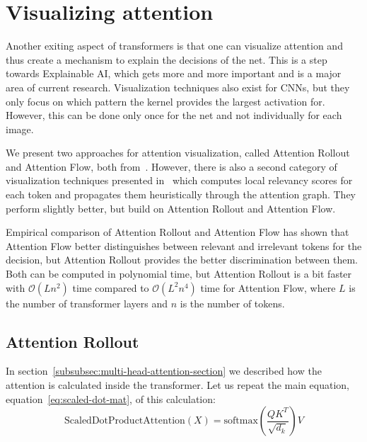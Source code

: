 \documentclass[a4paper]{scrartcl}
\let\stdsection\section
\renewcommand\section{\newpage\stdsection}
\begin{document}


    \section{Visualizing attention}\label{sec:visualizing-attention}
    Another exiting aspect of transformers is that one can visualize attention and thus create a mechanism to explain the decisions of the net.
    This is a step towards Explainable AI, which gets more and more important and is a major area of current research.
    Visualization techniques also exist for CNNs, but they only focus on which pattern the kernel provides the largest activation for.
    However, this can be done only once for the net and not individually for each image.

    We present two approaches for attention visualization, called Attention Rollout and Attention Flow, both from~\cite{abnar2020quantifying}.
    However, there is also a second category of visualization techniques presented in~\cite{chefer2021transformer} which computes local relevancy scores for each token and propagates them heuristically through the attention graph.
    They perform slightly better, but build on Attention Rollout and Attention Flow.

    Empirical comparison of Attention Rollout and Attention Flow has shown that Attention Flow better distinguishes between relevant and irrelevant tokens for the decision, but Attention Rollout provides the better discrimination between them.
    Both can be computed in polynomial time, but Attention Rollout is a bit faster with $\mathcal{O}(Ln^2)$ time compared to $\mathcal{O}(L^{2}n^4)$ time for Attention Flow, where $L$ is the number of transformer layers and $n$ is the number of tokens.

    \subsection{Attention Rollout}\label{subsec:attention-rollout}
    In section~\ref{subsubsec:multi-head-attention-section} we described how the attention is calculated inside the transformer.
    Let us repeat the main equation, equation~\ref{eq:scaled-dot-mat}, of this calculation:
    \begin{equation}
        \text{ScaledDotProductAttention}(X) = \text{softmax}(\frac{QK^T}{\sqrt {d_k}})V \label{eq:scaled-dot-mat-repeat}
    \end{equation}
\end{document}
